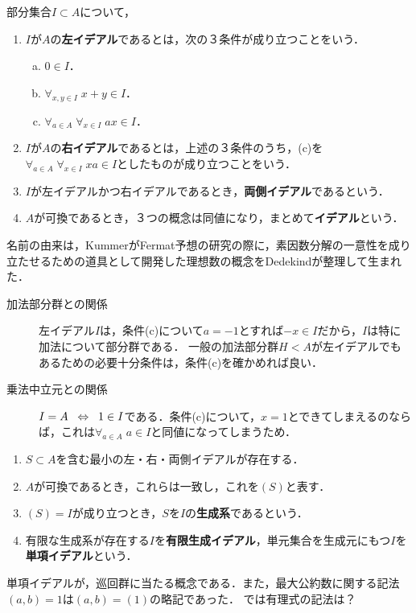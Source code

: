 \documentclass[uplatex,dvipdfmx]{jsreport}
\begin{document}
\begin{definition}
    部分集合$I\subset A$について，
    \begin{enumerate}
        \item $I$が$A$の\textbf{左イデアル}であるとは，次の３条件が成り立つことをいう．
        \begin{enumerate}[(a)]
            \item $0\in I$．
            \item $\forall_{x,y\in I}\;x+y\in I$．
            \item $\forall_{a\in A}\;\forall_{x\in I}\;ax\in I$．
        \end{enumerate}
        \item $I$が$A$の\textbf{右イデアル}であるとは，上述の３条件のうち，(c)を$\forall_{a\in A}\;\forall_{x\in I}\;xa\in I$としたものが成り立つことをいう．
        \item $I$が左イデアルかつ右イデアルであるとき，\textbf{両側イデアル}であるという．
        \item $A$が可換であるとき，３つの概念は同値になり，まとめて\textbf{イデアル}という．
    \end{enumerate}
\end{definition}
\begin{remark}[名前の由来]
    名前の由来は，KummerがFermat予想の研究の際に，素因数分解の一意性を成り立たせるための道具として開発した理想数の概念をDedekindが整理して生まれた．
\end{remark}
\begin{remark}[加法部分群との関係]\mbox{}
    \begin{description}
        \item[加法部分群との関係] 左イデアル$I$は，条件(c)について$a=-1$とすれば$-x\in I$だから，$I$は特に加法について部分群である．
        一般の加法部分群$H<A$が左イデアルでもあるための必要十分条件は，条件(c)を確かめれば良い．
        \item[乗法中立元との関係] $I=A\;\;\Leftrightarrow\;\; 1\in I$である．条件(c)について，$x=1$とできてしまえるのならば，これは$\forall_{a\in A}\;a\in I$と同値になってしまうため．
    \end{description}
\end{remark}

\begin{definition}\mbox{}
    \begin{enumerate}
        \item $S\subset A$を含む最小の左・右・両側イデアルが存在する．
        \item $A$が可換であるとき，これらは一致し，これを$(S)$と表す．
        \item $(S)=I$が成り立つとき，$S$を$I$の\textbf{生成系}であるという．
        \item 有限な生成系が存在する$I$を\textbf{有限生成イデアル}，単元集合を生成元にもつ$I$を\textbf{単項イデアル}という．
    \end{enumerate}
\end{definition}
\begin{remark}
    単項イデアルが，巡回群に当たる概念である．また，最大公約数に関する記法$(a,b)=1$は$(a,b)=(1)$の略記であった．
    では有理式の記法は？
\end{remark}
\end{document}
